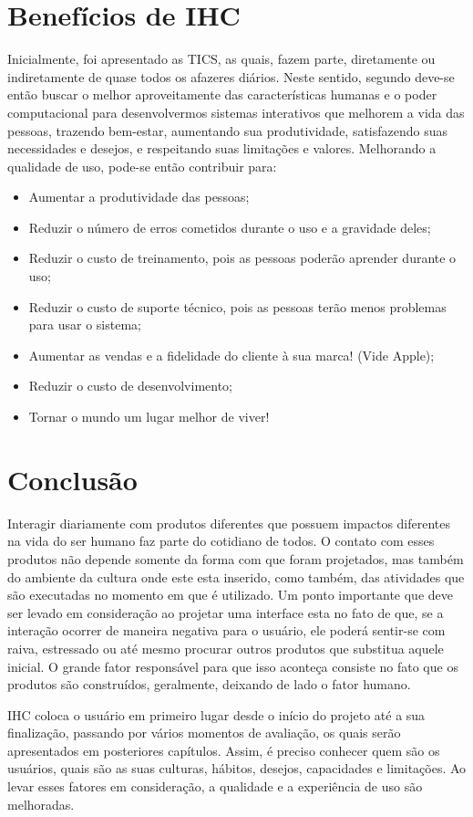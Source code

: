 \section{Benefícios de IHC}

Inicialmente, foi apresentado as TICS, as quais, fazem parte, diretamente ou indiretamente de quase todos os afazeres diários. Neste sentido, segundo  deve-se então buscar o melhor aproveitamente das características humanas e o poder computacional para desenvolvermos sistemas interativos que melhorem a vida das pessoas, trazendo bem-estar, aumentando sua produtividade, satisfazendo suas necessidades e desejos, e respeitando suas limitações e valores. Melhorando a qualidade de uso, pode-se então contribuir para:


\begin{itemize}
    \item Aumentar a produtividade das pessoas;
    \item Reduzir o número de erros cometidos durante o uso e a gravidade deles;
    \item Reduzir o custo de treinamento, pois as pessoas poderão aprender durante o uso;
    \item Reduzir o custo de suporte técnico, pois as pessoas terão menos problemas para usar o sistema;
    \item Aumentar as vendas e a fidelidade do cliente à sua marca! (Vide Apple);
    \item Reduzir o custo de desenvolvimento;
    \item Tornar o mundo um lugar melhor de viver!
\end{itemize}

\section{Conclusão}
Interagir diariamente com produtos diferentes que possuem impactos diferentes na vida do ser humano faz parte do cotidiano de todos. O contato com esses produtos não depende somente da forma com que foram projetados, mas também do ambiente da cultura onde este esta inserido, como também, das atividades que são executadas no momento em que é utilizado. Um ponto importante que deve ser levado em consideração ao projetar uma interface esta no fato de que, se a interação ocorrer de maneira negativa para o usuário, ele poderá sentir-se com raiva, estressado ou até mesmo procurar outros produtos que substitua aquele inicial. O grande fator responsável para que isso aconteça consiste no fato que os produtos são construídos, geralmente, deixando de lado o fator humano.

IHC coloca o usuário em primeiro lugar desde o início do projeto até a sua finalização, passando por vários momentos de avaliação, os quais serão apresentados em posteriores capítulos. Assim, é preciso conhecer quem são os usuários, quais são as suas culturas, hábitos, desejos, capacidades e limitações. Ao levar esses fatores em consideração, a qualidade e a experiência de uso são melhoradas. 
